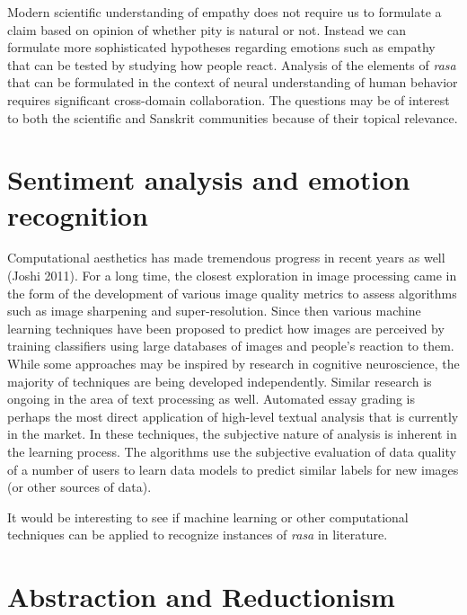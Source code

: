 Modern scientific understanding of empathy does not require us to formulate a claim based on opinion of whether pity is natural or not. Instead we can formulate more sophisticated hypotheses regarding emotions such as empathy that can be tested by studying how people react. Analysis of the elements of \textsl{rasa} that can be formulated in the context of neural understanding of human behavior requires significant cross-domain collaboration. The questions may be of interest to both the scientific and Sanskrit communities because of their topical relevance.\\[-20pt]

\section*{Sentiment analysis and emotion recognition}

Computational aesthetics has made tremendous progress in recent years as well (Joshi 2011). For a long time, the closest exploration in image processing came in the form of the development of various image quality metrics to assess algorithms such as image sharpening and super-resolution. Since then various machine learning techniques have been proposed to predict how images are perceived by training classifiers using large databases of images and people’s reaction to them. While some approaches may be inspired by research in cognitive neuroscience, the majority of techniques are being developed independently. Similar research is ongoing in the area of text processing as well. Automated essay grading is perhaps the most direct application of high-level textual analysis that is currently in the market. In these techniques, the subjective nature of analysis is inherent in the learning process. The algorithms use the subjective evaluation of data quality of a number of users to learn data models to predict similar labels for new images (or other sources of data).

It would be interesting to see if machine learning or other computational techniques can be applied to recognize instances of \textsl{rasa} in literature.\\[-21pt]

\section*{Abstraction and Reductionism}

